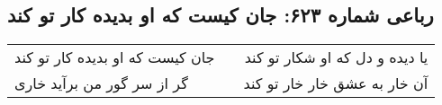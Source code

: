 \begin{center}
\section*{رباعی شماره ۶۲۳: جان کیست که او بدیده کار تو کند}
\label{sec:0623}
\begin{longtable}{l p{0.5cm} r}
جان کیست که او بدیده کار تو کند
&&
یا دیده و دل که او شکار تو کند
\\
گر از سر گور من برآید خاری
&&
آن خار به عشق خار خار تو کند
\\
\end{longtable}
\end{center}
